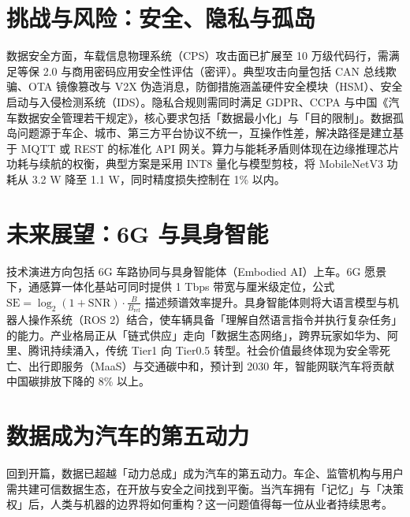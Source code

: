 \chapter{挑战与风险：安全、隐私与孤岛}
数据安全方面，车载信息物理系统（CPS）攻击面已扩展至 10 万级代码行，需满足等保 2.0 与商用密码应用安全性评估（密评）。典型攻击向量包括 CAN 总线欺骗、OTA 镜像篡改与 V2X 伪造消息，防御措施涵盖硬件安全模块（HSM）、安全启动与入侵检测系统（IDS）。隐私合规则需同时满足 GDPR、CCPA 与中国《汽车数据安全管理若干规定》，核心要求包括「数据最小化」与「目的限制」。数据孤岛问题源于车企、城市、第三方平台协议不统一，互操作性差，解决路径是建立基于 MQTT 或 REST 的标准化 API 网关。算力与能耗矛盾则体现在边缘推理芯片功耗与续航的权衡，典型方案是采用 INT8 量化与模型剪枝，将 MobileNetV3 功耗从 3.2 W 降至 1.1 W，同时精度损失控制在 1\%{} 以内。\par
\chapter{未来展望：6G 与具身智能}
技术演进方向包括 6G 车路协同与具身智能体（Embodied AI）上车。6G 愿景下，通感算一体化基站可同时提供 1 Tbps 带宽与厘米级定位，公式 $\text{SE} = \log _2(1 + \text{SNR}) \cdot \frac{B}{B_{\text{ref}}}$ 描述频谱效率提升。具身智能体则将大语言模型与机器人操作系统（ROS 2）结合，使车辆具备「理解自然语言指令并执行复杂任务」的能力。产业格局正从「链式供应」走向「数据生态网络」，跨界玩家如华为、阿里、腾讯持续涌入，传统 Tier1 向 Tier0.5 转型。社会价值最终体现为安全零死亡、出行即服务（MaaS）与交通碳中和，预计到 2030 年，智能网联汽车将贡献中国碳排放下降的 8\%{} 以上。\par
\chapter{数据成为汽车的第五动力}
回到开篇，数据已超越「动力总成」成为汽车的第五动力。车企、监管机构与用户需共建可信数据生态，在开放与安全之间找到平衡。当汽车拥有「记忆」与「决策权」后，人类与机器的边界将如何重构？这一问题值得每一位从业者持续思考。\par
